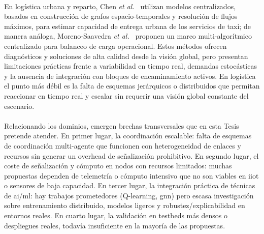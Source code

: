 \\
En logística urbana y reparto, Chen \textit{et al.}~\cite{Chen21taxi} utilizan modelos centralizados, basados en construcción de grafos espacio-temporales y resolución de flujos máximos, para estimar capacidad de entrega urbana de los servicios de taxi; de manera análoga, Moreno-Saavedra \textit{et al.}~\cite{moreno2024multi} proponen un marco multi-algorítmico centralizado para balanceo de carga operacional. Estos métodos ofrecen diagnósticos y soluciones de alta calidad desde la visión global, pero presentan limitaciones prácticas frente a variabilidad en tiempo real, demandas estocásticas y la ausencia de integración con bloques de encaminamiento activos. En logística el punto más débil es la falta de esquemas jerárquicos o distribuidos que permitan reaccionar en tiempo real y escalar sin requerir una visión global constante del escenario.\\
\\
Relacionando los dominios, emergen brechas transversales que en esta Tesis pretende atender. En primer lugar, la coordinación escalable: falta de esquemas de coordinación multi-agente que funcionen con heterogeneidad de enlaces y recursos sin generar un overhead de señalización prohibitivo. En segundo lugar, el coste de señalización y cómputo en nodos con recursos limitados: muchas propuestas dependen de telemetría o cómputo intensivo que no son viables en \gls{iiot} o sensores de baja capacidad. En tercer lugar, la integración práctica de técnicas de \gls{ai}/\gls{ml}: hay trabajos prometedores (Q-learning, \gls{gnn}) pero escasa investigación sobre entrenamiento distribuido, modelos ligeros y robustez/explicabilidad en entornos reales. En cuarto lugar, la validación en testbeds más densos o despliegues reales, todavía insuficiente en la mayoría de las propuestas.

